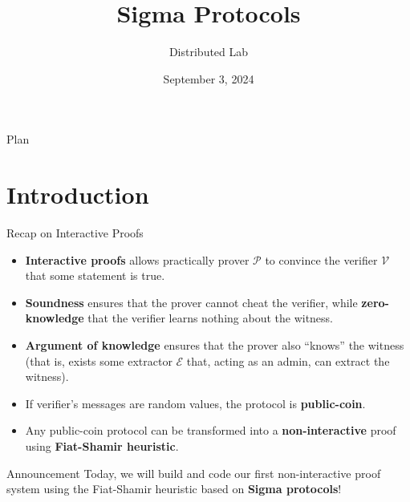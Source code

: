 \documentclass{zkdl-presentation-template}
\title[Introduction to ZK]{\textbf{Sigma Protocols}}
\author{Distributed Lab}
\date{September 3, 2024}
\begin{document}
	\frame {
		\titlepage
	}
 
	\begin{frame}{Plan}
        \tableofcontents
    \end{frame}

	\section{Introduction}


    \begin{frame}{Recap on Interactive Proofs}
        \begin{itemize}
            \item \textbf{Interactive proofs} allows practically prover $\mathcal{P}$ to convince the verifier $\mathcal{V}$ that some statement is true.
            \item \textbf{Soundness} ensures that the prover cannot cheat the verifier, while \textbf{zero-knowledge} that the verifier learns nothing about the witness.
            \item \textbf{Argument of knowledge} ensures that the prover also ``knows'' the witness (that is, exists some extractor $\mathcal{E}$ that, acting as an admin, can extract the witness).
            \item If verifier's messages are random values, the protocol is \textbf{public-coin}.
            \item Any public-coin protocol can be transformed into a \textbf{non-interactive} proof using \textbf{Fiat-Shamir heuristic}.
        \end{itemize}

        \begin{alertblock}{Announcement}
            Today, we will build and code our first non-interactive proof system using the Fiat-Shamir heuristic based on \textbf{Sigma protocols}!
        \end{alertblock}
    \end{frame}
\end{document}
